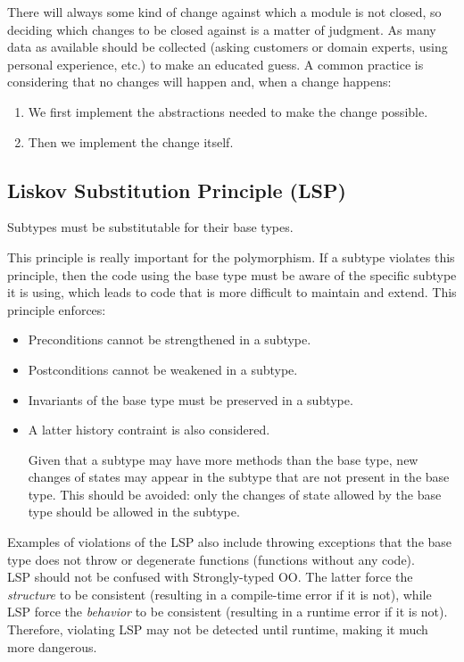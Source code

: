 There will always some kind of change against which a module is not closed, so deciding which changes to be closed against is a matter of judgment. As many data as available should be collected (asking customers or domain experts, using personal experience, etc.) to make an educated guess. A common practice is considering that no changes will happen and, when a change happens:
\begin{enumerate}
    \item We first implement the abstractions needed to make the change possible.
    \item Then we implement the change itself.
\end{enumerate}


\subsection{Liskov Substitution Principle (LSP)}
\begin{principio}
    Subtypes must be substitutable for their base types.
\end{principio}

This principle is really important for the polymorphism. If a subtype violates this principle, then the code using the base type must be aware of the specific subtype it is using, which leads to code that is more difficult to maintain and extend. This principle enforces:
\begin{itemize}
    \item Preconditions cannot be strengthened in a subtype.
    \item Postconditions cannot be weakened in a subtype.
    \item Invariants of the base type must be preserved in a subtype.
    \item A latter history contraint is also considered.
    
    Given that a subtype may have more methods than the base type, new changes of states may appear in the subtype that are not present in the base type. This should be avoided: only the changes of state allowed by the base type should be allowed in the subtype.
\end{itemize}

Examples of violations of the LSP also include throwing exceptions that the base type does not throw or degenerate functions (functions without any code).\\

LSP should not be confused with Strongly-typed OO. The latter force the \emph{structure} to be consistent (resulting in a compile-time error if it is not), while LSP force the \emph{behavior} to be consistent (resulting in a runtime error if it is not). Therefore, violating LSP may not be detected until runtime, making it much more dangerous.


